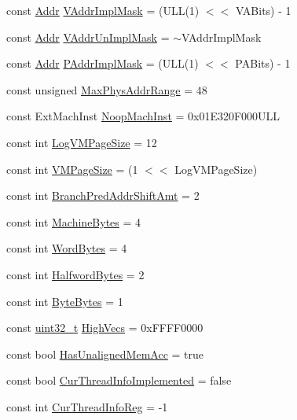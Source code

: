 \begin{DoxyCompactItemize}
const \hyperlink{classm5_1_1params_1_1Addr}{Addr} \hyperlink{namespaceArmISA_a3d31b41fa4d20dbbd91b61d7df201ac9}{VAddrImplMask} = (ULL(1) $<$$<$ VABits) -\/ 1
\item 
const \hyperlink{classm5_1_1params_1_1Addr}{Addr} \hyperlink{namespaceArmISA_abf1ec857b893186376e563b0da26ec1b}{VAddrUnImplMask} = $\sim$VAddrImplMask
\item 
const \hyperlink{classm5_1_1params_1_1Addr}{Addr} \hyperlink{namespaceArmISA_abb8b7685b079953e35015543262458e2}{PAddrImplMask} = (ULL(1) $<$$<$ PABits) -\/ 1
\item 
const unsigned \hyperlink{namespaceArmISA_ad202388a6cecd23caabbe7496f81e8d4}{MaxPhysAddrRange} = 48
\item 
const ExtMachInst \hyperlink{namespaceArmISA_a8d1e39e0ea757dcc9725c6ccd81dd4c4}{NoopMachInst} = 0x01E320F000ULL
\item 
const int \hyperlink{namespaceArmISA_a554fef169d109a5ccb7ce0dd6a43e521}{LogVMPageSize} = 12
\item 
const int \hyperlink{namespaceArmISA_a891eaf95159d764e6efae501c2860a3a}{VMPageSize} = (1 $<$$<$ LogVMPageSize)
\item 
const int \hyperlink{namespaceArmISA_a518c446960e93d236b89246eabc20298}{BranchPredAddrShiftAmt} = 2
\item 
const int \hyperlink{namespaceArmISA_a8f4ba87c53caab23396d3b86b672b0fb}{MachineBytes} = 4
\item 
const int \hyperlink{namespaceArmISA_ad7cbfaab22a0fe402fee6c200d5334ad}{WordBytes} = 4
\item 
const int \hyperlink{namespaceArmISA_af80fe89d59e1ea6cc089048f7e6ce436}{HalfwordBytes} = 2
\item 
const int \hyperlink{namespaceArmISA_a41548456e714690f506fe7d7b12a6c46}{ByteBytes} = 1
\item 
const \hyperlink{Type_8hh_a435d1572bf3f880d55459d9805097f62}{uint32\_\-t} \hyperlink{namespaceArmISA_aeaddc9566269afd4f1e9a27809efba97}{HighVecs} = 0xFFFF0000
\item 
const bool \hyperlink{namespaceArmISA_a1c3adbc67ce574fe545e332d3bc677be}{HasUnalignedMemAcc} = true
\item 
const bool \hyperlink{namespaceArmISA_a9faf3aac879cfa867d4ae15d4119c45e}{CurThreadInfoImplemented} = false
\item 
const int \hyperlink{namespaceArmISA_a7e5bf2f33f34327efc1eeccbb0c1141f}{CurThreadInfoReg} = -\/1
\end{DoxyCompactItemize}


